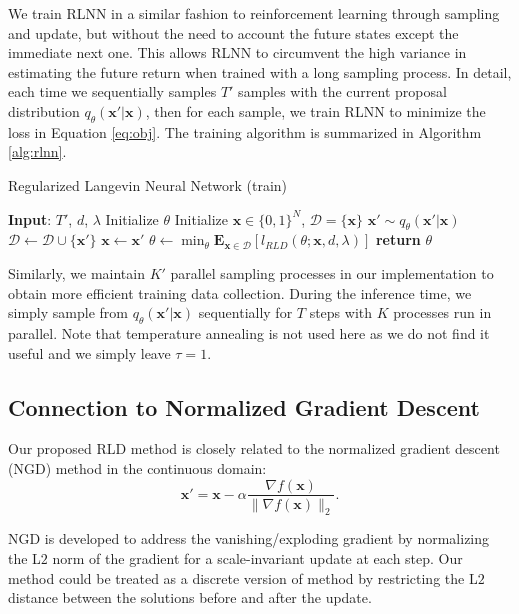 We train  RLNN in a similar fashion to reinforcement learning through sampling and update, but without the need to account the future states except the immediate next one. This allows RLNN to circumvent the high variance in estimating the future return when trained with a long sampling process. In detail, each time we sequentially samples $T'$ samples with the current proposal distribution $q_{\theta}(\mathbf{x}'|\mathbf{x})$, then for each sample, we train RLNN to minimize the loss in Equation \ref{eq:obj}. The training algorithm is summarized in Algorithm \ref{alg:rlnn}. 

\begin{algorithm}[H]
\caption{Regularized Langevin Neural Network (train)}
\label{alg:rlnn}
\begin{algorithmic}[1] %
\STATE \textbf{Input}: $T'$, $d$, $\lambda$ 
\STATE Initialize $\theta$
\STATE Initialize $\mathbf{x}\in \{0,1\}^{N}$, $\mathcal{D}=\{\mathbf{x}\}$
\STATE $\mathbf{x}' \sim q_{\theta}(\mathbf{x}'|\mathbf{x})$
\STATE $\mathcal{D}\leftarrow \mathcal{D}\cup\{\mathbf{x}'\}$
\STATE $\mathbf{x}\leftarrow\mathbf{x}'$
\ENDFOR 
\STATE $\theta \leftarrow \min_{\theta}\mathbf{E}_{\mathbf{x}\in\mathcal{D}}[l_{RLD}(\theta;\mathbf{x}, d, \lambda)]$
\ENDWHILE
\STATE\textbf{return} $\theta$ 
\end{algorithmic}
\end{algorithm} 
Similarly, we maintain $K'$ parallel sampling processes in our implementation to obtain more efficient training data collection. During the inference time, we simply sample from $q_{\theta}(\mathbf{x}'|\mathbf{x})$ sequentially for $T$ steps with $K$ processes run in parallel. Note that temperature annealing is not used here as we do not find it useful and we simply leave $\tau=1$.


\subsection{Connection to Normalized Gradient Descent}
\label{sec:connection}
Our proposed RLD method is closely related to the normalized gradient descent (NGD) method \citep{NGD06cortes} in the continuous domain:
\begin{equation}
    \mathbf{x}' = \mathbf{x} - \alpha\frac{\nabla f(\mathbf{x})}{\|\nabla f(\mathbf{x})\|_2}.
\end{equation}

NGD is developed to address the vanishing/exploding gradient by normalizing the L$2$ norm of the gradient for a scale-invariant update at each step. Our method could be treated as a discrete version of method by restricting the L$2$ distance between the solutions before and after the update. 

